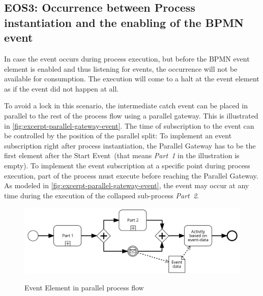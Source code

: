 \subsection*{EOS3: Occurrence between Process instantiation and the enabling of the BPMN event}

In case the event occurs during process execution, but before the BPMN event element is enabled and thus listening for events, the occurrence will not be available for consumption. 
The execution will come to a halt at the event element as if the event did not happen at all.

To avoid a lock in this scenario, the intermediate catch event can be placed in parallel to the rest of the process flow using a parallel gateway. 
This is illustrated in \autoref{fig:excerpt-parallel-gateway-event}. The time of subscription to the event can be controlled by the position of the parallel split: To implement an event subscription right after process instantiation, the Parallel Gateway has to be the first element after the Start Event~(that means \textit{Part~1} in the illustration is empty). 
To implement the event subscription at a specific point during process execution, part of the process must execute before reaching the Parallel Gateway. As modeled in \autoref{fig:excerpt-parallel-gateway-event}, the event may occur at any time during the execution of the collapsed sub-process \textit{Part~2}.

\begin{figure}[]
	\myfloatalign
	{\includegraphics[width=1\linewidth]{chapters/assessment/parallel-gateway-early-subscription.png}}
	\caption{Event Element in parallel process flow}\label{fig:excerpt-parallel-gateway-event}
\end{figure} 


